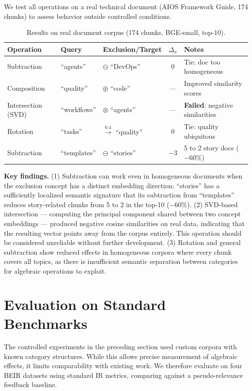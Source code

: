 \documentclass{article}
\begin{document}
We test all operations on a real technical document (AIOS Framework Guide, 174 chunks) to assess behavior outside controlled conditions.

\begin{table}[ht]
\centering
\caption{Results on real document corpus (174 chunks, BGE-small, top-10).}
\label{tab:exp4}
\begin{tabular}{lllcl}
\toprule
Operation & Query & Exclusion/Target & $\Delta_a$ & Notes \\
\midrule
Subtraction & ``agents'' & $\ominus$ ``DevOps'' & 0 & Tie: doc too homogeneous \\
Composition & ``quality'' & $\oplus$ ``code'' & --- & Improved similarity scores \\
Intersection (SVD) & ``workflows'' & $\otimes$ ``agents'' & --- & \textbf{Failed}: negative similarities \\
Rotation & ``tasks'' & $\xrightarrow{0.4}$ ``quality'' & 0 & Tie: quality ubiquitous \\
Subtraction & ``templates'' & $\ominus$ ``stories'' & \textbf{$-3$} & 5 to 2 story docs ($-60\%$) \\
\bottomrule
\end{tabular}
\end{table}

\textbf{Key findings.} (1) Subtraction can work even in homogeneous documents when the exclusion concept has a distinct embedding direction: ``stories'' has a sufficiently localized semantic signature that its subtraction from ``templates'' reduces story-related chunks from 5 to 2 in the top-10 ($-60\%$). (2) SVD-based intersection --- computing the principal component shared between two concept embeddings --- produced negative cosine similarities on real data, indicating that the resulting vector points away from the corpus entirely. This operation should be considered unreliable without further development. (3) Rotation and general subtraction show reduced effects in homogeneous corpora where every chunk covers all topics, as there is insufficient semantic separation between categories for algebraic operations to exploit.

\section{Evaluation on Standard Benchmarks}

The controlled experiments in the preceding section used custom corpora with known category structures. While this allows precise measurement of algebraic effects, it limits comparability with existing work. We therefore evaluate on four BEIR \cite{thakur2021} datasets using standard IR metrics, comparing against a pseudo-relevance feedback baseline.
\end{document}

